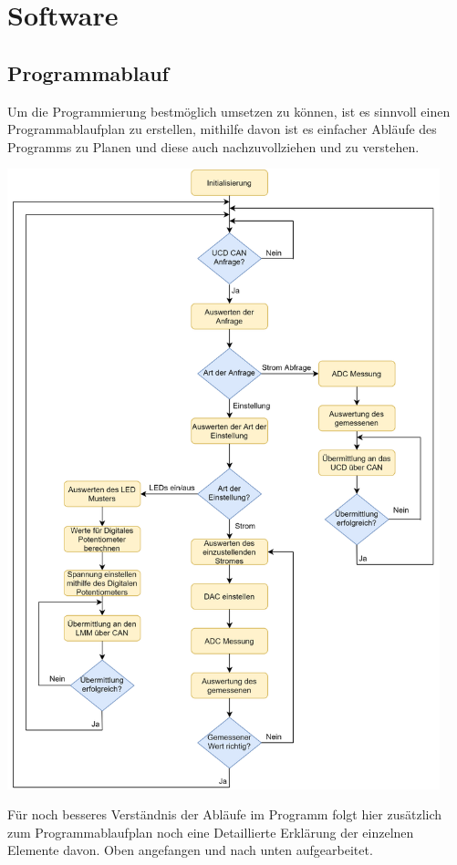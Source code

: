\documentclass[paper=a4, 12pt]{scrreprt}
\begin{document}
	\section{Software}\hfill \break
		\subsection{Programmablauf}\hfill \break
		Um die Programmierung bestmöglich umsetzen zu können, ist es sinnvoll einen Programmablaufplan zu erstellen, mithilfe davon ist es einfacher Abläufe des Programms zu Planen und diese auch nachzuvollziehen und zu verstehen.
		\begin{adjustbox}{center,caption={Programmablaufplan},label={fig:PAP.png},nofloat=figure,vspace=\bigskipamount}
			\includegraphics[height=18cm]{img/Dyn-LED-Driver-PAP.png}
		\end{adjustbox}
		Für noch besseres Verständnis der Abläufe im Programm folgt hier zusätzlich zum Programmablaufplan noch eine Detaillierte Erklärung der einzelnen Elemente davon. Oben angefangen und nach unten aufgearbeitet.
\end{document}
